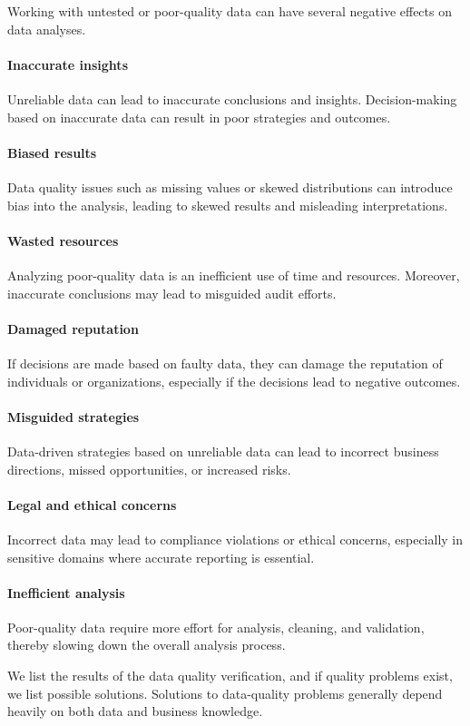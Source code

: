 \bigskip
Working with untested or poor-quality data can have several negative effects on data analyses.

\paragraph{Inaccurate insights} Unreliable data can lead to inaccurate conclusions and insights. Decision-making based on inaccurate data can result in poor strategies and outcomes.
\paragraph{Biased results} Data quality issues such as missing values or skewed distributions can introduce bias into the analysis, leading to skewed results and misleading interpretations.
\paragraph{Wasted resources}
Analyzing poor-quality data is an inefficient use of time and resources. Moreover, inaccurate conclusions may lead to misguided audit efforts.
\paragraph{Damaged reputation} If decisions are made based on faulty data, they can damage the reputation of individuals or organizations, especially if the decisions lead to negative outcomes.
\paragraph{Misguided strategies} Data-driven strategies based on unreliable data can lead to incorrect business directions, missed opportunities, or increased risks.
\paragraph{Legal and ethical concerns} Incorrect data may lead to compliance violations or ethical concerns, especially in sensitive domains where accurate reporting is essential.
\paragraph{Inefficient analysis} Poor-quality data require more effort for analysis, cleaning, and validation, thereby slowing down the overall analysis process.

\bigskip
We list the results of the data quality verification, and if quality problems exist, we list possible solutions. Solutions to data-quality problems generally depend heavily on both data and business knowledge.

